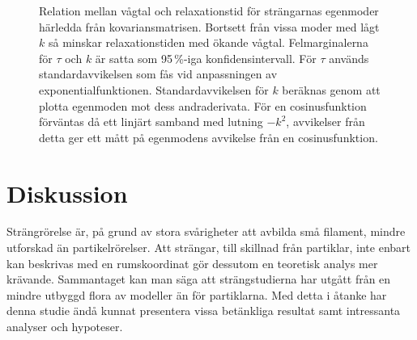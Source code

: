 
\begin{figure}\centerline{
\subfigure[][]{
\label{fig:ktauconf}
}
\subfigure[][]{
\label{fig:ktaunonconf}
}}
\caption{Relation mellan vågtal och relaxationstid för strängarnas egenmoder härledda från kovariansmatrisen. Bortsett från vissa moder med lågt $k$ så minskar relaxationstiden med ökande vågtal. Felmarginalerna för $\tau$ och $k$ är satta som 95\,\%-iga konfidensintervall. För $\tau$ används standardavvikelsen som fås vid anpassningen av exponentialfunktionen. Standardavvikelsen för $k$ beräknas genom att plotta egenmoden mot dess andraderivata. För en cosinusfunktion förväntas då ett linjärt samband med lutning $-k^2$, avvikelser från detta ger ett mått på egenmodens avvikelse från en cosinusfunktion.}
\label{fig:dispersion}
\end{figure}

\begin{comment}
\begin{figure}
    \centering
    
    \caption{Samband mellan $v_i(l)$ och $\frac{\pd^2v_i (l)}{\pd l^2}$ för att bestämma osäkerheten i anpassat vågtal. För en egenmod som är en exakt cosinusvåg väntas en rak linje med lutning $-k^2$; avvikelserna från en sådan linje antyder om hur mycket egenmoden avviker från en cosinusvåg.}
    \label{fig:osak_vagtal}
\end{figure}
\end{comment}


\section{Diskussion}

Strängrörelse är, på grund av stora svårigheter att avbilda små filament, mindre utforskad än partikelrörelser. Att strängar, till skillnad från partiklar, inte enbart kan beskrivas med en rumskoordinat gör dessutom en teoretisk analys mer krävande. Sammantaget kan man säga att strängstudierna har utgått från en mindre utbyggd flora av modeller än för partiklarna. Med detta i åtanke har denna studie ändå kunnat presentera vissa betänkliga resultat samt intressanta analyser och hypoteser.

